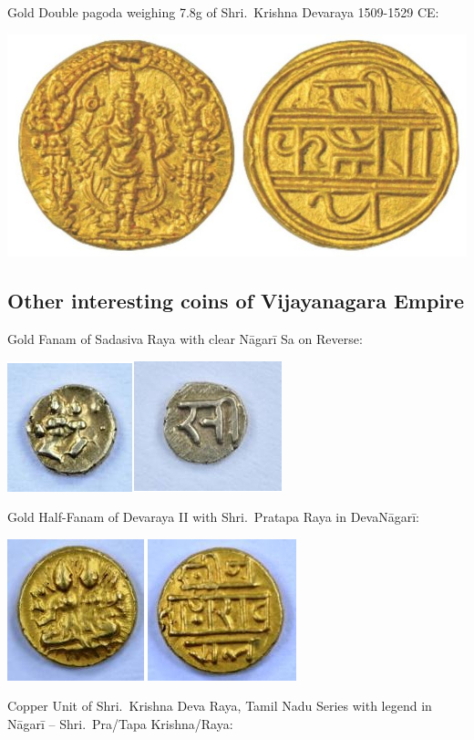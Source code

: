 Gold Double pagoda weighing 7.8g of Shri.\ Krishna Devaraya 1509-1529 CE:

\centerline{\includegraphics[scale=0.37]{"images/article-06/art06-fig20.jpg"}}


\subsection*{Other interesting coins of Vijayanagara Empire}

Gold Fanam of Sadasiva Raya with clear Nāgarī Sa on Reverse:

\vskip 4pt

\centerline{\includegraphics[scale=0.6]{"images/article-06/art06-fig21.jpg"}}

Gold Half-Fanam of Devaraya II with Shri.\ Pratapa Raya in DevaNāgarī:

\vskip 4pt

\centerline{\includegraphics[scale=0.6]{"images/article-06/art06-fig22.jpg"}}

Copper Unit of Shri.\ Krishna Deva Raya, Tamil Nadu Series with legend in Nāgarī – Shri.\ Pra/Tapa Krishna/Raya:

